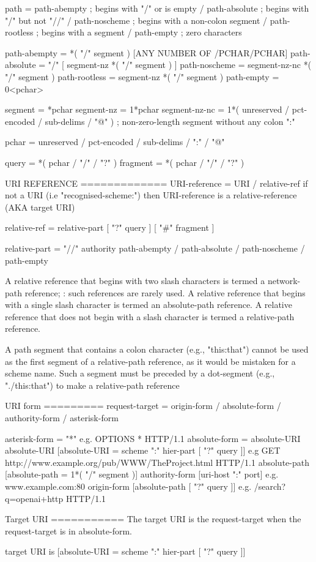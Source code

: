 path          = path-abempty    ; begins with "/" or is empty
                    / path-absolute   ; begins with "/" but not "//"
                    / path-noscheme   ; begins with a non-colon segment
                    / path-rootless   ; begins with a segment
                    / path-empty      ; zero characters
  
  path-abempty  = *( "/" segment )  [ANY NUMBER OF /PCHAR/PCHAR]
  path-absolute = "/" [ segment-nz *( "/" segment ) ]
  path-noscheme = segment-nz-nc *( "/" segment )
  path-rootless = segment-nz *( "/" segment )
  path-empty    = 0<pchar>

  segment       = *pchar
  segment-nz    = 1*pchar
  segment-nz-nc = 1*( unreserved / pct-encoded / sub-delims / "@" )
                ; non-zero-length segment without any colon ":"

  pchar         = unreserved / pct-encoded / sub-delims / ":" / "@"

query       = *( pchar / "/" / "?" )
 fragment    = *( pchar / "/" / "?" )



  URI REFERENCE
  =============
  URI-reference = URI / relative-ref
    if not a URI (i.e "recognised-scheme:") then URI-reference is a relative-reference (AKA target URI)

    relative-ref  = relative-part [ "?" query ] [ "#" fragment ]

    relative-part = "//" authority path-abempty
                  / path-absolute
                  / path-noscheme
                  / path-empty

        A relative reference that begins with two slash characters is termed a network-path reference; : such references are rarely used.  
        A relative reference that begins with a single slash character is termed an absolute-path reference.
        A relative reference that does not begin with a slash character is termed a relative-path reference.  
       
        A path segment that contains a colon character (e.g., "this:that") cannot be used as the first segment 
          of a relative-path reference, as it would be mistaken for a scheme name. 
        Such a segment must be preceded by a dot-segment (e.g., "./this:that") to make a relative-path reference

URI form
=========
request-target = origin-form
                 / absolute-form
                 / authority-form
                 / asterisk-form

asterisk-form  = "*"													e.g. OPTIONS * HTTP/1.1
absolute-form = absolute-URI										
absolute-URI 	[absolute-URI  = scheme ":" hier-part [ "?" query ]] 	e.g GET http://www.example.org/pub/WWW/TheProject.html HTTP/1.1
absolute-path 	[absolute-path = 1*( "/" segment )]						
authority-form	[uri-host ":" port]										e.g. www.example.com:80
origin-form   	[absolute-path [ "?" query ]]							e.g. /search?q=openai+http HTTP/1.1							

Target URI 
===========
The target URI is the request-target when the request-target is in absolute-form. 

target URI is [absolute-URI  = scheme ":" hier-part [ "?" query ]]